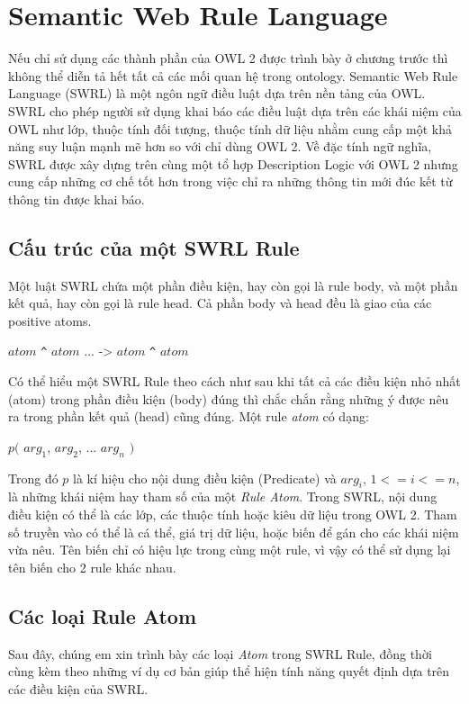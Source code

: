 \chapter{Semantic Web Rule Language}
Nếu chỉ sử dụng các thành phần của  OWL 2 được trình bày ở chương trước thì không thể diễn tả hết tất cả các mối quan hệ trong ontology. Semantic Web Rule Language (SWRL) là một ngôn ngữ điều luật dựa trên nền tảng của OWL. SWRL cho phép người sử dụng khai báo các điều luật dựa trên các khái niệm của OWL như lớp, thuộc tính đối tượng, thuộc tính dữ liệu nhằm cung cấp một khả năng suy luận mạnh mẽ hơn so với chỉ dùng OWL 2. Về đặc tính ngữ nghĩa, SWRL được xây dựng trên cùng một tổ hợp Description Logic với OWL 2 nhưng cung cấp những cơ chế tốt hơn trong việc chỉ ra những thông tin mới đúc kết từ thông tin được khai báo.

\section{Cấu trúc của một SWRL Rule \cite{swrlfaq}}
Một luật SWRL chứa một phần điều kiện, hay còn gọi là rule body, và một phần kết quả, hay còn gọi là rule head. Cả phần body và head đều là giao của các positive atoms.
\begin{center}
$atom$ \verb|^| $atom$ ... -> $atom$ \verb|^| $atom$ 
\end{center}
Có thể hiểu một SWRL Rule theo cách như sau khi tất cả các điều kiện nhỏ nhất (atom) trong phần điều kiện (body) đúng thì chắc chắn rằng những ý được nêu ra trong phần kết quả (head) cũng đúng. Một rule \textit{atom} có dạng:
\begin{center}
$p($ $arg_{1}$, $arg_{2}$, ... $arg_{n}$ $)$
\end{center}
Trong đó $p$ là kí hiệu cho nội dung điều kiện (Predicate) và $arg_{i}$, $1<=i<=n$, là những khái niệm hay tham số của một \textit{Rule Atom}. Trong SWRL, nội dung điều kiện có thể là các lớp, các thuộc tính hoặc kiêu dữ liệu trong OWL 2. Tham số truyền vào có thể là cá thể, giá trị dữ liệu, hoặc biến để gán cho các khái niệm vừa nêu. Tên biến chỉ có hiệu lực trong cùng một rule, vì vậy có thể sử dụng lại tên biến cho 2 rule khác nhau.
\section{Các loại Rule Atom}
Sau đây, chúng em xin trình bày các loại \textit{Atom} trong SWRL Rule, đồng thời cùng kèm theo những ví dụ cơ bản giúp thể hiện tính năng quyết định dựa trên các điều kiện của SWRL.
